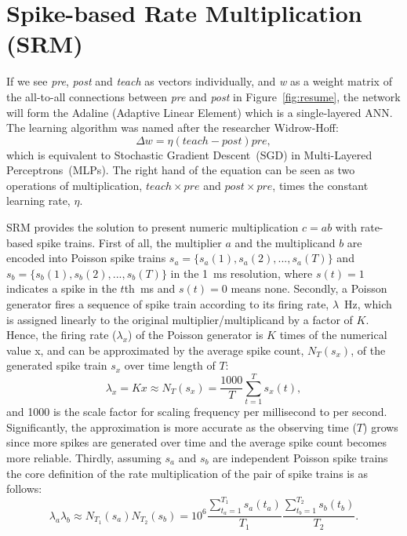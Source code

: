 \section{Spike-based Rate Multiplication (SRM)}
\label{sec:SRM}
If we see \textit{pre}, \textit{post} and \textit{teach} as vectors individually, and \textit{w} as a weight matrix of the all-to-all connections between \textit{pre} and \textit{post} in Figure~\ref{fig:resume}, the network will form the Adaline (Adaptive Linear Element) which is a single-layered ANN.
The learning algorithm was named after the researcher Widrow-Hoff:
\begin{equation}
\Delta w = \eta (teach - post)pre,
\end{equation}
which is equivalent to Stochastic Gradient Descent~(SGD) in Multi-Layered Perceptrons~(MLPs).
The right hand of the equation can be seen as two operations of multiplication, $teach \times pre$ and $post \times pre$, times the constant learning rate, $\eta$.

SRM provides the solution to present numeric multiplication $c=ab$ with rate-based spike trains.
First of all, the multiplier $a$ and the multiplicand $b$ are encoded into Poisson spike trains $s_a=\{s_a(1),s_a(2),...,s_a(T)\}$ and $s_b=\{s_b(1),s_b(2),...,s_b(T)\}$ in the 1~ms resolution, where $s(t)=1$ indicates a spike in the $t$th~ms and $s(t)=0$ means none.
Secondly, a Poisson generator fires a sequence of spike train according to its firing rate, $\lambda$~Hz, which is assigned linearly to the original multiplier/multiplicand by a factor of $K$.
Hence, the firing rate ($\lambda_x$) of the Poisson generator is $K$ times of the numerical value x, and can be approximated by the average spike count, $N_T(s_x)$, of the generated spike train $s_x$ over time length of $T$:
\begin{equation}
\lambda_x = Kx \approx N_T(s_x) = \frac{1000}{T} \sum_{t=1}^{T} s_x(t) ,
\end{equation} 
and 1000 is the scale factor for scaling frequency per millisecond to per second.
Significantly, the approximation is more accurate as the observing time ($T$) grows since more spikes are generated over time and the average spike count becomes more reliable.
Thirdly, assuming $s_a$ and $s_b$ are independent Poisson spike trains the core definition of the rate multiplication of the pair of spike trains is as follows:
\begin{equation}
\lambda_a \lambda_b \approx N_{T_1}(s_a)N_{T_2}(s_b)= 10^6 \frac{\sum_{t_a=1}^{T_1}s_a(t_a)}{T_1}  \frac{\sum_{t_b=1}^{T_2} s_b(t_b)}{T_2}.
\label{equ:mul}
\end{equation} 

